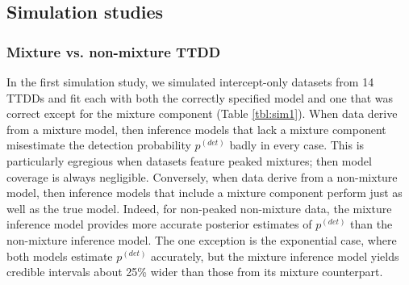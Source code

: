 \documentclass[useAMS,usenatbib,referee,12pt]{article}
\begin{document}
\subsection{Simulation studies}

\subsubsection{Mixture vs. non-mixture TTDD}\label{sec:mixture}

In the first simulation study, we simulated intercept-only datasets from 14 TTDDs and fit each with both the correctly specified model and one that was correct except for the mixture component (Table \ref{tbl:sim1}).  When data derive from a mixture model, then inference models that lack a mixture component misestimate the detection probability $p^{(det)}$ badly in every case.  This is particularly egregious when datasets feature peaked mixtures; then model coverage is always negligible.  Conversely, when data derive from a non-mixture model, then inference models that include a mixture component perform just as well as the true model.  Indeed, for non-peaked non-mixture data, the mixture inference model provides more accurate posterior estimates of $p^{(det)}$ than the non-mixture inference model.  The one exception is the exponential case, where both models estimate $p^{(det)}$ accurately, but the mixture inference model yields credible intervals about 25\% wider than those from its mixture counterpart.

\end{document}
